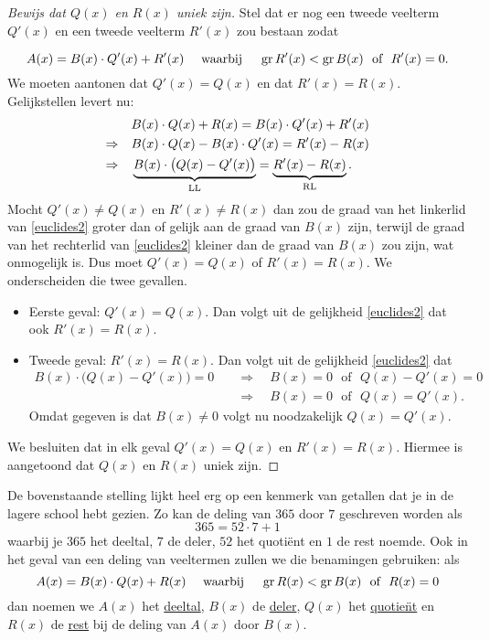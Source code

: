 \documentclass{ximera}
\begin{document}
	
	
	
	
	\begin{proof}[Bewijs dat $Q(x)$ en $R(x)$ uniek zijn] Stel dat er nog een tweede veelterm $Q'(x)$ en een tweede veelterm $R'(x)$ zou bestaan zodat
	
	\[
	A(x) = B(x)\cdot Q'(x) + R'(x) \quad \text{ waarbij } \quad \operatorname{gr} R'(x) < \operatorname{gr} B(x) \,\, \text{ of } \,\, R'(x) = 0.
	\]
	We moeten aantonen dat $Q'(x) = Q(x)$ en dat $R'(x) = R(x)$. Gelijkstellen levert nu:
	\begin{align}
	& B(x) \cdot Q(x) + R(x) = B(x) \cdot Q'(x) + R'(x) \notag \\
	\Rightarrow \quad & B(x) \cdot Q(x) - B(x) \cdot Q'(x) = R'(x) - R(x) \notag \\
	\Rightarrow \quad & \underbrace{B(x) \cdot \bigl(Q(x) - Q'(x)\bigr)}_{\text{LL}} = \underbrace{R'(x) - R(x)}_{\text{RL}}. \label{euclides2}
	\end{align}
	Mocht $Q'(x) \neq Q(x)$ en $R'(x) \neq R(x)$ dan zou de graad van het linkerlid van \eqref{euclides2} groter dan of gelijk aan de graad van $B(x)$ zijn, terwijl de graad van het rechterlid van \eqref{euclides2} kleiner dan de graad van $B(x)$ zou zijn, wat onmogelijk is. Dus moet $Q'(x) = Q(x)$ of $R'(x) = R(x)$. We onderscheiden die twee gevallen.
	\begin{itemize}
	\item[]
	Eerste geval: $Q'(x) = Q(x)$. Dan volgt uit de gelijkheid \eqref{euclides2} dat ook $R'(x) = R(x)$.  
	\item[]
	Tweede geval: $R'(x) = R(x)$. Dan volgt uit de gelijkheid \eqref{euclides2} dat
	\begin{align*}
	B(x) \cdot \bigl(Q(x) - Q'(x)\bigr) = 0 \quad 
	& \Rightarrow \quad B(x) = 0 \,\, \text{ of } \,\, Q(x) - Q'(x) = 0 \\
	& \Rightarrow \quad B(x) = 0 \,\, \text{ of } \,\, Q(x) = Q'(x). 
	\end{align*}
	Omdat gegeven is dat $B(x) \neq 0$ volgt nu noodzakelijk $Q(x) = Q'(x)$.
	\end{itemize}
	We besluiten dat in elk geval $Q'(x) = Q(x)$ en $R'(x) = R(x)$. Hiermee is aangetoond dat $Q(x)$ en $R(x)$ uniek zijn. 
	
	\end{proof}
	
	
	De bovenstaande stelling lijkt heel erg op een kenmerk van getallen dat je in de lagere school hebt gezien. Zo kan de deling van $365$ door $7$ geschreven worden als
	\[
	365 = 52 \cdot 7 + 1
	\]
	waarbij je $365$ het deeltal, $7$ de deler, $52$ het quoti\"ent en $1$ de rest noemde. Ook in het geval van een deling van veeltermen zullen we die benamingen gebruiken: als
	\[
	A(x) = B(x)\cdot Q(x) + R(x) \quad \text{ waarbij } \quad \operatorname{gr} R(x) < \operatorname{gr} B(x) \,\, \text{ of } \,\, R(x) = 0
	\]
	dan noemen we $A(x)$ het \underline{deeltal}, $B(x)$ de \underline{deler}, $Q(x)$ het \underline{quotie\"nt} en $R(x)$ de \underline{rest} bij de deling van $A(x)$ door $B(x)$. 
	
\end{document}

